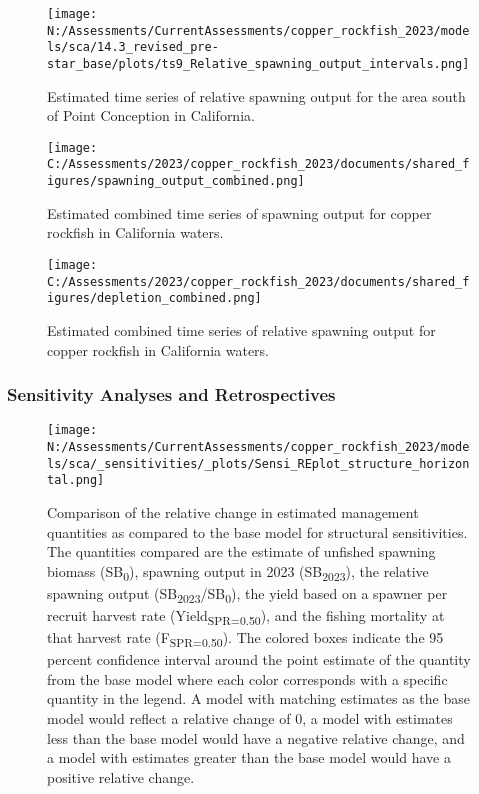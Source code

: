 \documentclass[11pt,
  english,
  letterpaper,
]{article}
\begin{document}
\pagebreak

\begin{figure}
\centering
\texttt{[image: N:/Assessments/CurrentAssessments/copper\_rockfish\_2023/models/sca/14.3\_revised\_pre-star\_base/plots/ts9\_Relative\_spawning\_output\_intervals.png]}
\caption{Estimated time series of relative spawning output for the area south of Point Conception in California.\label{fig:depl}}
\end{figure}

\pagebreak

\begin{figure}
\centering
\texttt{[image: C:/Assessments/2023/copper\_rockfish\_2023/documents/shared\_figures/spawning\_output\_combined.png]}
\caption{Estimated combined time series of spawning output for copper rockfish in California waters.\label{fig:sb-all}}
\end{figure}

\clearpage

\begin{figure}
\centering
\texttt{[image: C:/Assessments/2023/copper\_rockfish\_2023/documents/shared\_figures/depletion\_combined.png]}
\caption{Estimated combined time series of relative spawning output for copper rockfish in California waters.\label{fig:depl-all}}
\end{figure}

\clearpage

\hypertarget{sensitivity-analyses-and-retrospectives}{%
\subsubsection{Sensitivity Analyses and Retrospectives}\label{sensitivity-analyses-and-retrospectives}}

\begin{figure}
\centering
\texttt{[image: N:/Assessments/CurrentAssessments/copper\_rockfish\_2023/models/sca/\_sensitivities/\_plots/Sensi\_REplot\_structure\_horizontal.png]}
\caption{Comparison of the relative change in estimated management quantities as compared to the base model for structural sensitivities. The quantities compared are the estimate of unfished spawning biomass (SB\textsubscript{0}), spawning output in 2023 (SB\textsubscript{2023}), the relative spawning output (SB\textsubscript{2023}/SB\textsubscript{0}), the yield based on a spawner per recruit harvest rate (Yield\textsubscript{SPR=0.50}), and the fishing mortality at that harvest rate (F\textsubscript{SPR=0.50}). The colored boxes indicate the 95 percent confidence interval around the point estimate of the quantity from the base model where each color corresponds with a specific quantity in the legend. A model with matching estimates as the base model would reflect a relative change of 0, a model with estimates less than the base model would have a negative relative change, and a model with estimates greater than the base model would have a positive relative change.\label{fig:sens-structure}}
\end{figure}
\end{document}
